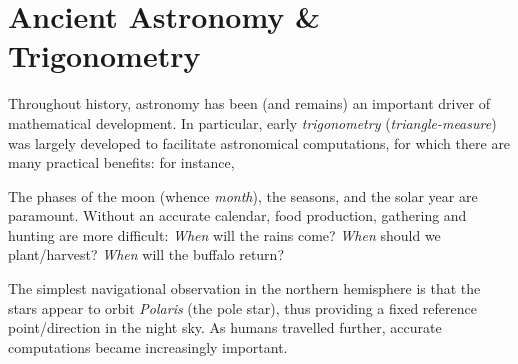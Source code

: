 \graphicspath{{4astro/asy/}}

\section{Ancient Astronomy \& Trigonometry}

Throughout history, astronomy has been (and remains) an important driver of mathematical development. In particular, early \emph{trigonometry} (\emph{triangle-measure}) was largely developed to facilitate astronomical computations, for which there are many practical benefits: for instance,
\begin{description}\itemsep0pt
	\item[\normalfont\emph{Calendars}] The phases of the moon (whence \emph{month}), the seasons, and the solar year are paramount. Without an accurate calendar, food production, gathering and hunting are more difficult: \emph{When} will the rains come? \emph{When} should we plant/harvest? \emph{When} will the buffalo return? 
	\item[\normalfont\emph{Navigation}] The simplest navigational observation in the northern hemisphere is that the stars appear to orbit \emph{Polaris} (the pole star), thus providing a fixed reference point/direction in the night sky. As humans travelled further, accurate computations became increasingly important.
\end{description}



